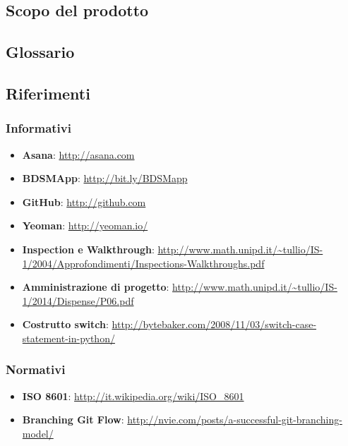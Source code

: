 	\subsection{Scopo del prodotto}
		\productScope

	\subsection{Glossario}
		\glossarioDesc

	\subsection{Riferimenti}
		\subsubsection{Informativi}
		\begin{itemize}
			\item \textbf{Asana}: \url{http://asana.com}
			\item \textbf{BDSMApp}: \url{http://bit.ly/BDSMapp}
			\item \textbf{GitHub}: \url{http://github.com}
			\item \textbf{Yeoman}: \url{http://yeoman.io/}
			\item \textbf{Inspection e Walkthrough}: \url{http://www.math.unipd.it/~tullio/IS-1/2004/Approfondimenti/Inspections-Walkthroughs.pdf}
			\item \textbf{Amministrazione di progetto}: \url{http://www.math.unipd.it/~tullio/IS-1/2014/Dispense/P06.pdf}
			\item \textbf{Costrutto switch}: \url{http://bytebaker.com/2008/11/03/switch-case-statement-in-python/}
		\end{itemize}

		\subsubsection{Normativi}
		\begin{itemize}
			\item \textbf{ISO 8601}: \url{http://it.wikipedia.org/wiki/ISO_8601}
			\item \textbf{Branching Git Flow}: \url{http://nvie.com/posts/a-successful-git-branching-model/}
		\end{itemize}